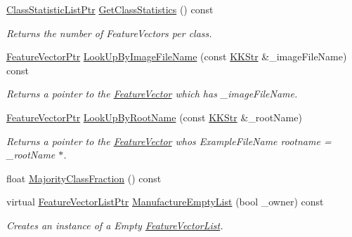 \begin{DoxyCompactItemize}
\item 
\hyperlink{namespace_k_k_m_l_l_a94c12d8466d389018764e996caebf7a1}{Class\+Statistic\+List\+Ptr} \hyperlink{class_k_k_m_l_l_1_1_feature_vector_list_a25d68202689dd6400dcf9a3b18fd5ad9}{Get\+Class\+Statistics} () const 
\begin{DoxyCompactList}\small\item\em Returns the number of Feature\+Vectors per class. \end{DoxyCompactList}\item 
\hyperlink{namespace_k_k_m_l_l_a0c5df3d48f45926fbc4fee04f5e3bc04}{Feature\+Vector\+Ptr} \hyperlink{class_k_k_m_l_l_1_1_feature_vector_list_a7b336e2b7b9a08db64623f8a7b7c694b}{Look\+Up\+By\+Image\+File\+Name} (const \hyperlink{class_k_k_b_1_1_k_k_str}{K\+K\+Str} \&\+\_\+image\+File\+Name) const 
\begin{DoxyCompactList}\small\item\em Returns a pointer to the \hyperlink{class_k_k_m_l_l_1_1_feature_vector}{Feature\+Vector} which has \textquotesingle{}\+\_\+image\+File\+Name\textquotesingle{}. \end{DoxyCompactList}\item 
\hyperlink{namespace_k_k_m_l_l_a0c5df3d48f45926fbc4fee04f5e3bc04}{Feature\+Vector\+Ptr} \hyperlink{class_k_k_m_l_l_1_1_feature_vector_list_a06e11b3bcd75592c09f0821fd90e5c6f}{Look\+Up\+By\+Root\+Name} (const \hyperlink{class_k_k_b_1_1_k_k_str}{K\+K\+Str} \&\+\_\+root\+Name)
\begin{DoxyCompactList}\small\item\em Returns a pointer to the \hyperlink{class_k_k_m_l_l_1_1_feature_vector}{Feature\+Vector} who\textquotesingle{}s Example\+File\+Name rootname = \+\_\+root\+Name $\ast$. \end{DoxyCompactList}\item 
float \hyperlink{class_k_k_m_l_l_1_1_feature_vector_list_a6e7458e3f8d285dec467f883873be89b}{Majority\+Class\+Fraction} () const 
\item 
virtual \hyperlink{class_k_k_m_l_l_1_1_feature_vector_list_af22f34b214e0dd3b16760002ce392355}{Feature\+Vector\+List\+Ptr} \hyperlink{class_k_k_m_l_l_1_1_feature_vector_list_af533da1b34e4123f4fcb1343d5f48e37}{Manufacture\+Empty\+List} (bool \+\_\+owner) const 
\begin{DoxyCompactList}\small\item\em Creates an instance of a Empty \hyperlink{class_k_k_m_l_l_1_1_feature_vector_list}{Feature\+Vector\+List}. \end{DoxyCompactList}\item 

\end{DoxyCompactItemize}

